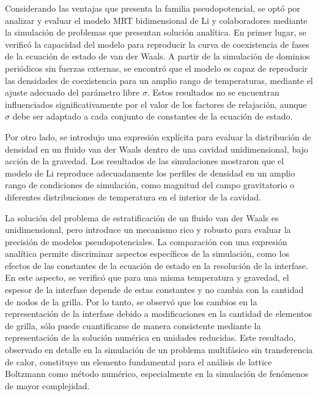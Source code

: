 Considerando las ventajas que presenta la familia pseudopotencial, se opt\'o por analizar y evaluar el modelo MRT bidimensional de Li y colaboradores mediante la simulaci\'on de problemas que presentan soluci\'on anal\'itica. En primer lugar, se verific\'o la capacidad del modelo para reproducir la curva de coexistencia de fases de la ecuaci\'on de estado de van der Waals. A partir de la simulaci\'on de dominios peri\'odicos sin fuerzas externas, se encontr\'o que el modelo es capaz de reproducir las densidades de coexistencia para un amplio rango de temperaturas, mediante el ajuste adecuado del par\'ametro libre $\sigma$. Estos resultados no se encuentran influenciados significativamente por el valor de los factores de relajaci\'on, aunque $\sigma$ debe ser adaptado a cada conjunto de constantes de la ecuaci\'on de estado.

Por otro lado, se introdujo una expresi\'on expl\'icita para evaluar la distribuci\'on de densidad en un fluido van der Waals dentro de una cavidad unidimensional, bajo acci\'on de la gravedad. Los resultados de las simulaciones mostraron que el modelo de Li reproduce adecuadamente los perfiles de densidad en un amplio rango de condiciones de simulaci\'on, como magnitud del campo gravitatorio o diferentes distribuciones de temperatura en el interior de la cavidad.

La soluci\'on del problema de estratificaci\'on de un fluido van der Waals es unidimensional, pero introduce un mecanismo rico y robusto para evaluar la precisi\'on de modelos pseudopotenciales. La comparaci\'on con una expresi\'on anal\'itica permite discriminar aspectos espec\'ificos de la simulaci\'on, como los efectos de las constantes de la ecuaci\'on de estado en la resoluci\'on de la interfase. En este aspecto, se verific\'o que para una misma temperatura y gravedad, el espesor de la interfase depende de estas constantes y no cambia con la cantidad de nodos de la grilla. Por lo tanto, se observ\'o que los cambios en la representaci\'on de la interfase debido a modificaciones en la cantidad de elementos de grilla, s\'olo puede cuantificarse de manera consistente mediante la representaci\'on de la soluci\'on num\'erica en unidades reducidas. Este resultado, observado en detalle en la simulaci\'on de un problema multif\'asico sin transferencia de calor, constituye un elemento fundamental para el an\'alisis de lattice Boltzmann como m\'etodo num\'erico, especialmente en la simulaci\'on de fen\'omenos de mayor complejidad.
